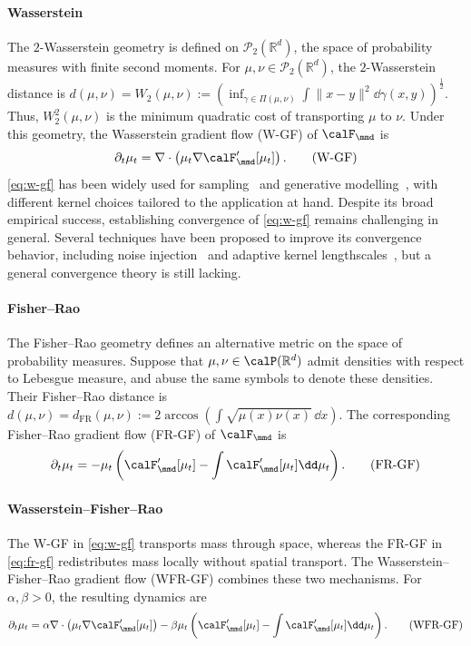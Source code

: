 \paragraph{Wasserstein} 
The $2$-Wasserstein geometry is defined on $\mathcal{P}_2(\mathbb{R}^d)$, the space of probability measures with finite second moments. For $\mu,\nu\in\mathcal{P}_2(\mathbb{R}^d)$, the $2$-Wasserstein distance is $d(\mu,\nu)=W_2(\mu,\nu):=\left(\inf _{\gamma \in \Pi(\mu, \nu)} \int \|x-y\|^2 \dd \gamma(x, y)\right)^{\frac{1}{2}}$. Thus, $W_2^2(\mu,\nu)$ is the minimum quadratic cost of transporting $\mu$ to $\nu$. Under this geometry, the Wasserstein gradient flow (W-GF) of $\calF_{\mmd}$ is~\citep{arbel2019maximum,korba2021kernel}
\begin{align}\label{eq:w-gf}
\partial_t \mu_t = \nabla\cdot \left(\mu_t \nabla \calF_{\mmd}'[\mu_t]\right). \tag{W-GF}
\end{align}
\eqref{eq:w-gf} has been widely used for sampling~\citep{chen2025stationary} and generative modelling~\citep{galashov2024deep}, with different kernel choices tailored to the application at hand. Despite its broad empirical success, establishing convergence of \eqref{eq:w-gf} remains challenging in general. 
Several techniques have been proposed to improve its convergence behavior, including noise injection~\citep{arbel2019maximum,suzuki2023uniform,chen2026thinned} and adaptive kernel lengthscales~\citep{kang2026gradient}, but a general convergence theory is still lacking. 


\paragraph{Fisher--Rao}
The Fisher--Rao geometry defines an alternative metric on the space of probability measures. Suppose that $\mu,\nu\in\calP(\mathbb{R}^d)$ admit densities with respect to Lebesgue measure, and abuse the same symbols to denote these densities. Their Fisher--Rao distance is
$d(\mu,\nu)=d_{\mathrm{FR}}(\mu,\nu) := 2\arccos \left(
\int \sqrt{\mu(x)\nu(x)} \,\dd x
\right)$. 
The corresponding Fisher--Rao gradient flow (FR-GF) of $\calF_{\mmd}$ is
\begin{align}\label{eq:fr-gf}
\partial_t\mu_t = -\mu_t \left( \calF_{\mmd}'[\mu_t] - \int \calF_{\mmd}'[\mu_t]  \dd \mu_t \right). \tag{FR-GF}
\end{align}

\paragraph{Wasserstein--Fisher--Rao}
The W-GF in \eqref{eq:w-gf} transports mass through space, whereas the FR-GF in \eqref{eq:fr-gf} redistributes mass locally without spatial transport. The Wasserstein--Fisher--Rao gradient flow (WFR-GF) combines these two mechanisms. For $\alpha,\beta>0$, the resulting dynamics are
\begin{align}\label{eq:wfr-gf}
\partial_t\mu_t = \alpha \nabla\cdot \left(\mu_t \nabla \calF_{\mmd}'[\mu_t]\right) - \beta \mu_t \left( \calF_{\mmd}'[\mu_t] - \int \calF_{\mmd}'[\mu_t]  \dd \mu_t \right). \tag{WFR-GF}
\end{align} 


